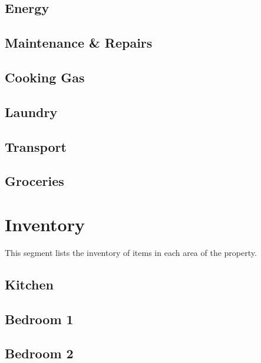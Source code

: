 \documentclass[letterpaper,10pt,openany,oneside,english]{sphinxmanual}
\begin{document}
\subsection{Energy}
\label{\detokenize{categories:energy}}

\subsection{Maintenance \& Repairs}
\label{\detokenize{categories:maintenance-repairs}}

\subsection{Cooking Gas}
\label{\detokenize{categories:cooking-gas}}

\subsection{Laundry}
\label{\detokenize{categories:laundry}}

\subsection{Transport}
\label{\detokenize{categories:transport}}

\subsection{Groceries}
\label{\detokenize{categories:groceries}}

\section{Inventory}
\label{\detokenize{categories:inventory}}
\sphinxAtStartPar
This segment lists the inventory of items in each area of the property.


\subsection{Kitchen}
\label{\detokenize{categories:kitchen}}

\subsection{Bedroom 1}
\label{\detokenize{categories:bedroom-1}}

\subsection{Bedroom 2}
\label{\detokenize{categories:bedroom-2}}
\end{document}
